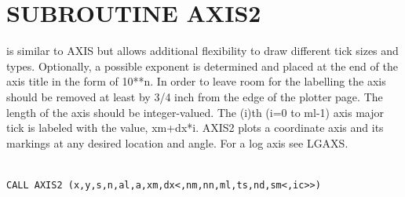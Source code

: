 \documentclass[11pt]{report}
\begin{document}
\section{SUBROUTINE AXIS2}

 is similar to AXIS but allows additional flexibility to draw
different tick sizes and types.  Optionally, a possible exponent
is determined and placed at the end of the axis title in the form
of 10**n.  In  order  to  leave room  for the labelling the
axis should be removed at least by 3/4 inch from the edge of the plotter page.
The length of the axis should be integer-valued.  The (i)th (i=0 to ml-1)
axis major tick is labeled with the value, xm+dx*i.
AXIS2 plots a coordinate axis and its markings at any desired location 
and angle.  For a log axis see LGAXS.
\begin{verbatim}

CALL AXIS2 (x,y,s,n,al,a,xm,dx<,nm,nn,ml,ts,nd,sm<,ic>>)


\end{verbatim}
\end{document}
